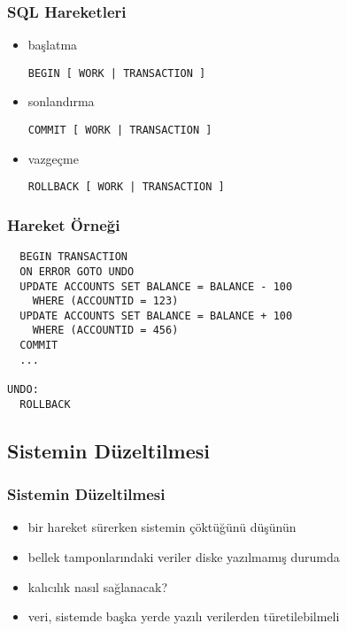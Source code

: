 \documentclass[dvipsnames]{beamer}
\theoremstyle{plain}
\begin{document}
\begin{frame}[fragile]
  \frametitle{SQL Hareketleri}

  \begin{itemize}
    \item başlatma
    \begin{lstlisting}
BEGIN [ WORK | TRANSACTION ]
    \end{lstlisting}

    \item sonlandırma
    \begin{lstlisting}
COMMIT [ WORK | TRANSACTION ]
    \end{lstlisting}

    \item vazgeçme
    \begin{lstlisting}
ROLLBACK [ WORK | TRANSACTION ]
    \end{lstlisting}
  \end{itemize}
\end{frame}

\begin{frame}[fragile]
  \frametitle{Hareket Örneği}

  \begin{lstlisting}
  BEGIN TRANSACTION
  ON ERROR GOTO UNDO
  UPDATE ACCOUNTS SET BALANCE = BALANCE - 100
    WHERE (ACCOUNTID = 123)
  UPDATE ACCOUNTS SET BALANCE = BALANCE + 100
    WHERE (ACCOUNTID = 456)
  COMMIT
  ...

UNDO:
  ROLLBACK
  \end{lstlisting}
\end{frame}

\subsection{Sistemin Düzeltilmesi}

\begin{frame}
  \frametitle{Sistemin Düzeltilmesi}

  \begin{itemize}
    \item bir hareket sürerken sistemin çöktüğünü düşünün
    \item bellek tamponlarındaki veriler diske yazılmamış durumda

    \pause
    \medskip
    \item kalıcılık nasıl sağlanacak?
    \item veri, sistemde başka yerde yazılı verilerden türetilebilmeli
  \end{itemize}
\end{frame}
\end{document}
